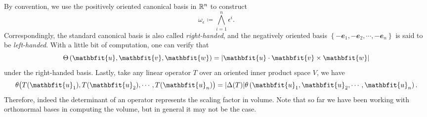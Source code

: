 \documentclass[math, code]{amznotes}
\theoremstyle{remark}
\begin{document}
By convention, we use the positively oriented canonical basis in $\mathbb{R}^n$ to construct 
\begin{equation*}
    \omega_{\epsilon} \coloneqq \bigwedge_{i = 1}^n\epsilon^i.
\end{equation*}
Correspondingly, the standard canonical basis is also called \textit{right-handed}, and the negatively oriented basis $\left\{-\mathbfit{e}_1, -\mathbfit{e}_2, \cdots, -\mathbfit{e}_n\right\}$ is said to be \textit{left-handed}. With a little bit of computation, one can verify that 
\begin{equation*}
    \Theta\left(\mathbfit{u}, \mathbfit{v}, \mathbfit{w}\right) = \abs{\mathbfit{u} \cdot \mathbfit{v} \times \mathbfit{w}}
\end{equation*}
under the right-handed basis. Lastly, take any linear operator $T$ over an oriented inner product space $V$, we have 
\begin{align*}
    \theta\bigl(T(\mathbfit{u}_1), T(\mathbfit{u}_2), \cdots, T(\mathbfit{u}_n)\bigr) = \abs{\Delta(T)}\theta\left(\mathbfit{u}_1, \mathbfit{u}_2, \cdots, \mathbfit{u}_n\right).
\end{align*}
Therefore, indeed the determinant of an operator represents the scaling factor in volume. Note that so far we have been working with orthonormal bases in computing the volume, but in general it may not be the case.
\end{document}
